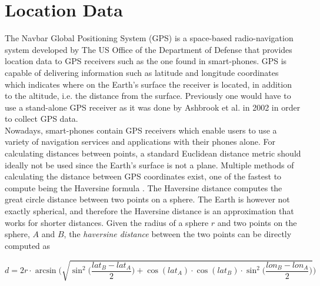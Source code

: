 \section{Location Data}
The Navbar Global Positioning System (GPS) is a space-based radio-navigation system developed by The US Office of the Department of Defense \cite{gps-navstar} that provides location data to GPS receivers such as the one found in smart-phones. GPS is capable of delivering information such as latitude and longitude coordinates which indicates where on the Earth's surface the receiver is located, in addition to the altitude, i.e. the distance from the surface. Previously one would have to use a stand-alone GPS receiver as it was done by Ashbrook et al.  in 2002 \cite{using_gps_to_learn_significant_locations} in order to collect GPS data.\\

Nowadays, smart-phones contain GPS receivers which enable users to use a variety of navigation services and applications with their phones alone. For calculating distances between points, a standard Euclidean distance metric should ideally not be used since the Earth's surface is not a plane. Multiple methods of calculating the distance between GPS coordinates exist, one of the fastest to compute being the Haversine formula \cite{haversine-formula}. The Haversine distance computes the great circle distance between two points on a sphere. The Earth is however not exactly spherical, and therefore the Haversine distance is an approximation that works for shorter distances. Given the radius of a sphere $r$ and two points on the sphere, $A$ and $B$, the \textit{haversine distance} between the two points can be directly computed as 

\begin{equation}
\label{eq:haversine}
d = 2r \cdot \arcsin \Bigg( \sqrt{\sin^2 \bigg( \frac{lat_B - lat_A}{2} \bigg) + \cos(lat_A) \cdot \cos(lat_B) \cdot \sin^2 \bigg(\frac{ lon_B - lon_A}{2} \bigg)}\Bigg)
\end{equation}

